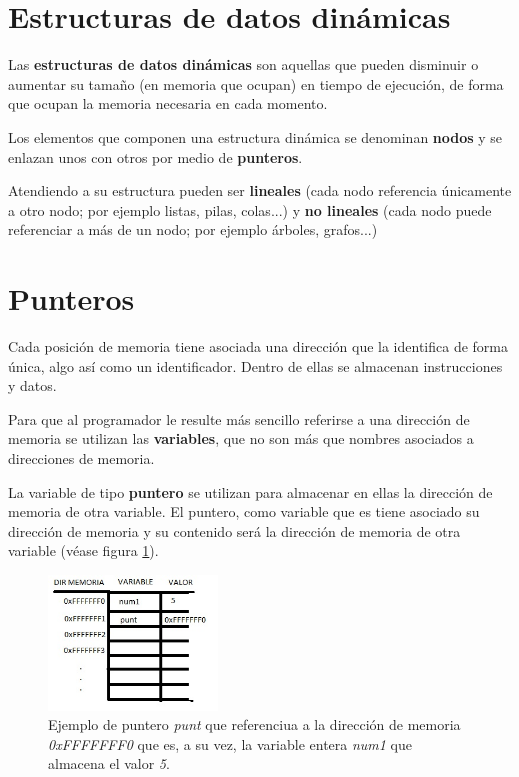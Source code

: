 \documentclass[a4paper, 11pt, titlepage]{article}
\begin{document}
\section{Estructuras de datos dinámicas}\label{estructuradinamica}

    Las \textbf{estructuras de datos dinámicas} son aquellas que pueden disminuir o aumentar su 
    tamaño (en memoria que ocupan) en tiempo de ejecución, de forma que ocupan la memoria necesaria
    en cada momento.

    Los elementos que componen una estructura dinámica se denominan \textbf{nodos} y se enlazan unos
    con otros por medio de \textbf{punteros}.

    Atendiendo a su estructura pueden ser \textbf{lineales} (cada nodo referencia únicamente a 
    otro nodo; por ejemplo listas, pilas, colas...) y \textbf{no lineales} (cada nodo puede referenciar
    a más de un nodo; por ejemplo árboles, grafos...)

\section{Punteros}

    Cada posición de memoria tiene asociada una dirección que la identifica de forma única, algo así
    como un identificador. Dentro de ellas se almacenan instrucciones y datos.

    Para que al programador le resulte más sencillo referirse a una dirección de memoria se utilizan
    las \textbf{variables}, que no son más que nombres asociados a direcciones de memoria.

    La variable de tipo \textbf{puntero} se utilizan para almacenar en ellas la dirección de memoria 
    de otra variable. El puntero, como variable que es tiene asociado su dirección de memoria y su contenido 
    será la dirección de memoria de otra variable (véase figura \ref{puntero}).

    \begin{figure}[htp]
        \centering
        \includegraphics[width=0.4\textwidth]{resources/puntero.jpg}
        \caption{Ejemplo de puntero \textit{punt} que referenciua a la dirección de 
        memoria \textit{0xFFFFFFF0} que es, a su vez, la variable entera \textit{num1}
        que almacena el valor \textit{5}.}
        \label{puntero}
    \end{figure}
\end{document}
